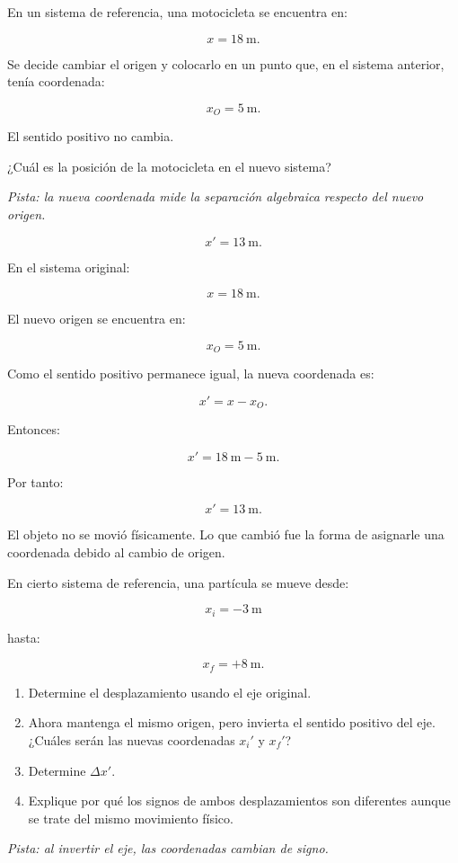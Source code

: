 \begin{ejercicio}
En un sistema de referencia, una motocicleta se encuentra en:

\[ x=\SI{18}{\meter}. \]

Se decide cambiar el origen y colocarlo en un punto que, en el sistema anterior, tenía coordenada:

\[ x_O=\SI{5}{\meter}. \]

El sentido positivo no cambia.

¿Cuál es la posición de la motocicleta en el nuevo sistema?

\textit{Pista: la nueva coordenada mide la separación algebraica respecto del nuevo origen.}
\end{ejercicio}

\begin{respuesta}
\[ \boxed{x'=\SI{13}{\meter}}. \]
\end{respuesta}

\begin{explicacion}
En el sistema original:

\[ x=\SI{18}{\meter}. \]

El nuevo origen se encuentra en:

\[ x_O=\SI{5}{\meter}. \]

Como el sentido positivo permanece igual, la nueva coordenada es:

\[ x'=x-x_O. \]

Entonces:

\[
x'
=
\SI{18}{\meter}
-
\SI{5}{\meter}.
\]

Por tanto:

\[ \boxed{x'=\SI{13}{\meter}}. \]

El objeto no se movió físicamente. Lo que cambió fue la forma de asignarle una coordenada debido al cambio de origen.
\end{explicacion}


\begin{ejercicio}
En cierto sistema de referencia, una partícula se mueve desde:

\[ x_i=-\SI{3}{\meter} \]

hasta:

\[ x_f=+\SI{8}{\meter}. \]

\begin{enumerate}[label=\alph*)]
    \item Determine el desplazamiento usando el eje original.
    \item Ahora mantenga el mismo origen, pero invierta el sentido positivo del eje. ¿Cuáles serán las nuevas coordenadas \(x_i'\) y \(x_f'\)?
    \item Determine \(\Delta x'\).
    \item Explique por qué los signos de ambos desplazamientos son diferentes aunque se trate del mismo movimiento físico.
\end{enumerate}

\textit{Pista: al invertir el eje, las coordenadas cambian de signo.}
\end{ejercicio}

